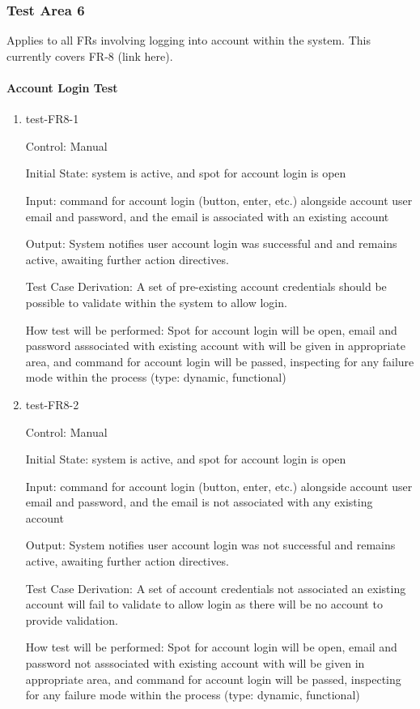 \documentclass[12pt, titlepage]{article}
\begin{document}
\subsubsection{Test Area 6}

Applies to all FRs involving logging into account within the system. This 
currently covers FR-8 (link here).

\paragraph{Account Login Test}

\begin{enumerate}

\item{test-FR8-1\\}

Control: Manual
					
Initial State: system is active, and spot for account login is open
					
Input: command for account login (button, enter, etc.) alongside account 
user email and password, and the email is associated with an existing 
account
					
Output: System notifies user account login was successful and and remains 
active, awaiting further action directives.

Test Case Derivation: A set of pre-existing account credentials should be
possible to validate within the system to allow login.

How test will be performed: Spot for account login will be open, email and 
password asssociated with existing account with will be given in appropriate 
area, and command for account login will be passed, inspecting for any 
failure mode within the process (type: dynamic, functional)

\item{test-FR8-2\\}

Control: Manual
					
Initial State: system is active, and spot for account login is open
					
Input: command for account login (button, enter, etc.) alongside account 
user email and password, and the email is not associated with any existing 
account
					
Output: System notifies user account login was not successful and remains 
active, awaiting further action directives.

Test Case Derivation: A set of account credentials not associated an existing 
account will fail to validate to allow login as there will be no account
to provide validation. 

How test will be performed: Spot for account login will be open, email and 
password not asssociated with existing account with will be given in appropriate 
area, and command for account login will be passed, inspecting for any 
failure mode within the process (type: dynamic, functional)
					

\end{enumerate}
\end{document}
